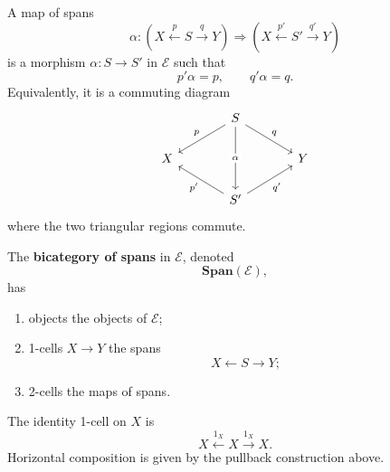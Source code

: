 A map of spans
\[
    \alpha:
    \left(
        X 
        \xleftarrow{p} 
        S 
        \xrightarrow{q} 
        Y
    \right)
    \Longrightarrow
    \left(
        X 
        \xleftarrow{p'} 
        S' 
        \xrightarrow{q'} 
        Y
    \right)
\]
is a morphism \(\alpha:S\to S'\) in \(\mathcal E\) such that
\[
    p'\alpha=p,
    \qquad
    q'\alpha=q.
\]
Equivalently, it is a commuting diagram
\[
    \begin{tikzcd}[column sep=large]
        & 
            S 
                \arrow[dd, "\alpha" description] 
                \arrow[dl, "p"'] 
                \arrow[dr, "q"] 
        & 
        \\
            X 
        &
        & 
            Y 
        \\
        & 
            S' 
                \arrow[ul, "p'"] 
                \arrow[ur, "q'"'] 
        &
    \end{tikzcd}
\]
where the two triangular regions commute.

\begin{definition}
\label{def:bicategory-of-spans}
    The \textbf{bicategory of spans} in \(\mathcal E\), denoted
    \[
        \mathbf{Span}(\mathcal E),
    \]
    has
    \begin{enumerate}
        \item objects the objects of \(\mathcal E\);

        \item 1-cells \(X\to Y\) the spans
        \[
            X \xleftarrow{} S \xrightarrow{} Y;
        \]

        \item 2-cells the maps of spans.
    \end{enumerate}
    The identity 1-cell on \(X\) is
    \[
        X \xleftarrow{1_X} X \xrightarrow{1_X} X.
    \]
    Horizontal composition is given by the pullback construction above.
\end{definition}

